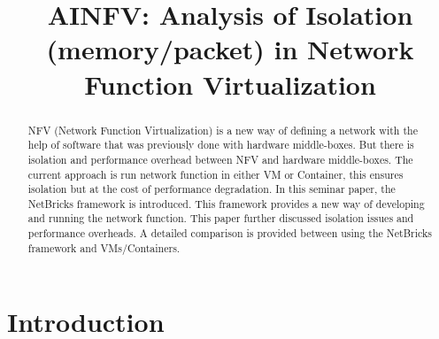 \documentclass[10pt, a4paper, conference]{IEEEtran}
\begin{document}

\title{AINFV: Analysis of Isolation (memory/packet) in Network Function Virtualization }
% 


\author{
  
}

\maketitle

\begin{abstract}
NFV (Network Function Virtualization) is a new way of defining a network with the help of software that was previously done with hardware middle-boxes. But there is isolation and performance overhead between NFV and hardware middle-boxes. The current approach is run network function in either VM or Container, this ensures isolation but at the cost of performance degradation. In this seminar paper, the NetBricks framework is introduced. This framework provides a new way of developing and running the network function. This paper further discussed isolation issues and performance overheads. A detailed comparison is provided between using the NetBricks framework and VMs/Containers.   
\end{abstract}



%
\IEEEpeerreviewmaketitle


\section{Introduction }
\label{sec:intro}
\end{document}

